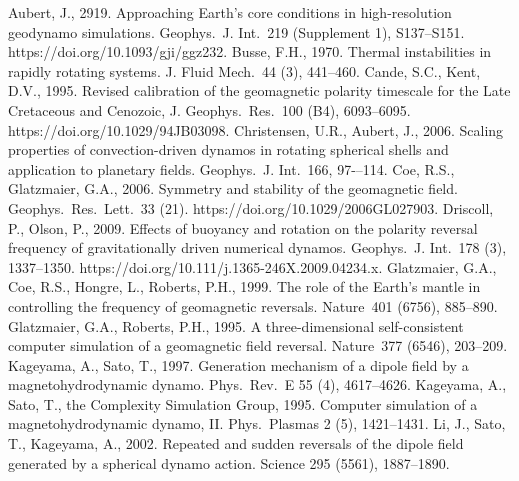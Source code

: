\begin{thebibliography}{}
%
Aubert, J., 2919. Approaching Earth's core conditions in high-resolution geodynamo simulations. Geophys.\ J. Int.\ 219 (Supplement 1), S137--S151. https://doi.org/10.1093/gji/ggz232.
%
Busse, F.H., 1970. Thermal instabilities in rapidly rotating systems. J. Fluid Mech.\ 44 (3), 441--460.
%
Cande, S.C., Kent, D.V., 1995. Revised calibration of the geomagnetic polarity timescale for the Late Cretaceous and Cenozoic, J. Geophys.\ Res.\ 100 (B4), 6093--6095. https://doi.org/10.1029/94JB03098.
%
Christensen, U.R., Aubert, J., 2006. Scaling properties of convection-driven dynamos in rotating spherical shells and application to planetary fields. Geophys.\ J. Int.\ 166, 97-–114.
%   
Coe, R.S., Glatzmaier, G.A., 2006. Symmetry and stability of the geomagnetic field. Geophys.\ Res.\ Lett.\ 33 (21). https://doi.org/10.1029/2006GL027903.
%
Driscoll, P., Olson, P., 2009. Effects of buoyancy and rotation on the polarity reversal frequency of gravitationally driven numerical dynamos. Geophys.\ J. Int.\ 178 (3), 1337--1350. https://doi.org/10.111/j.1365-246X.2009.04234.x.
%
Glatzmaier, G.A., Coe, R.S., Hongre, L., Roberts, P.H., 1999. The role of the Earth's mantle in controlling the frequency of geomagnetic reversals. Nature\ 401 (6756), 885--890.
%
Glatzmaier, G.A., Roberts, P.H., 1995. A three-dimensional self-consistent computer simulation of a geomagnetic field reversal. Nature\ 377 (6546), 203--209.
%
Kageyama, A., Sato, T., 1997. Generation mechanism of a dipole field by a magnetohydrodynamic dynamo. Phys.\ Rev.\ E 55 (4), 4617--4626.
%
Kageyama, A., Sato, T., the Complexity Simulation Group, 1995. Computer simulation of a magnetohydrodynamic dynamo, II. Phys.\ Plasmas 2 (5), 1421--1431.
%
Li, J., Sato, T., Kageyama, A., 2002. Repeated and sudden reversals of the dipole field generated by a spherical dynamo action. Science 295 (5561), 1887--1890.

\end{thebibliography}
